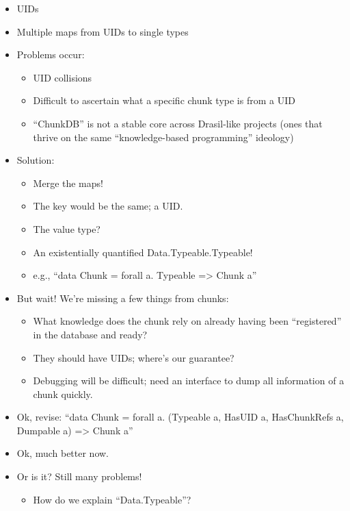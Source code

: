 \begin{itemize}
    \item UIDs
    \item Multiple maps from UIDs to single types
    \item Problems occur:
          \begin{itemize}
              \item UID collisions
              \item Difficult to ascertain what a specific chunk type is from a
                    UID
              \item ``ChunkDB'' is not a stable core across Drasil-like projects
                    (ones that thrive on the same ``knowledge-based programming''
                    ideology)
          \end{itemize}
    \item Solution:
          \begin{itemize}
              \item Merge the maps!
              \item The key would be the same; a UID.
              \item The value type?
              \item An existentially quantified Data.Typeable.Typeable!
              \item e.g., ``data Chunk = forall a. Typeable => Chunk a''
          \end{itemize}
    \item But wait! We're missing a few things from chunks:
          \begin{itemize}
              \item What knowledge does the chunk rely on already having been
                    ``registered'' in the database and ready?
              \item They should have UIDs; where's our guarantee?
              \item Debugging will be difficult; need an interface to dump all
                    information of a chunk quickly.
          \end{itemize}
    \item Ok, revise: ``data Chunk = forall a. (Typeable a, HasUID a,
          HasChunkRefs a, Dumpable a) => Chunk a''
    \item Ok, much better now.
    \item Or is it? Still many problems!
          \begin{itemize}
              \item How do we explain ``Data.Typeable''?

\end{itemize}
\end{itemize}
